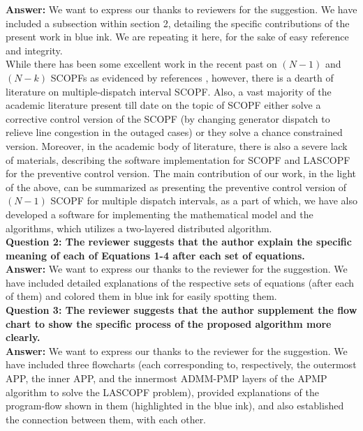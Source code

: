 \documentclass[8pt]{article}
\begin{document}
\textbf{Answer: }We want to express our thanks to reviewers for the suggestion. We have included a subsection within section 2, detailing the specific contributions of the present work in blue ink. We are repeating it here, for the sake of easy reference and integrity. \\
While there has been some excellent work in the recent past on $(N-1)$ and $(N-k)$ SCOPFs as evidenced by references \cite{capitanescu2011state, lubin2015robust, amjady2011security, la1998line, articleSCOPF}, however, there is a dearth of literature on multiple-dispatch interval SCOPF. Also, a vast majority of the academic literature present till date on the topic of SCOPF either solve a corrective control version of the SCOPF (by changing generator dispatch to relieve line congestion in the outaged cases) or they solve a chance constrained version. Moreover, in the academic body of literature, there is also a severe lack of materials, describing the software implementation for SCOPF and LASCOPF for the preventive control version. The main contribution of our work, in the light of the above, can be summarized as presenting the preventive control version of $(N-1)$ SCOPF for multiple dispatch intervals, as a part of which, we have also developed a software for implementing the mathematical model and the algorithms, which utilizes a two-layered distributed algorithm.\\
 
\textbf{Question 2: The reviewer suggests that the author explain the specific meaning of each of Equations 1-4 after each set of equations.}\\

\textbf{Answer: }We want to express our thanks to the reviewer for the suggestion. We have included detailed explanations of the respective sets of equations (after each of them) and colored them in blue ink for easily spotting them.\\

\textbf{Question 3: The reviewer suggests that the author supplement the flow chart to show the specific process of the proposed algorithm more clearly.}\\

\textbf{Answer: }We want to express our thanks to the reviewer for the suggestion. We have included three flowcharts (each corresponding to, respectively, the outermost APP, the inner APP, and the innermost ADMM-PMP layers of the APMP algorithm to solve the LASCOPF problem), provided explanations of the program-flow shown in them (highlighted in the blue ink), and also established the connection between them, with each other.\\
\end{document}
